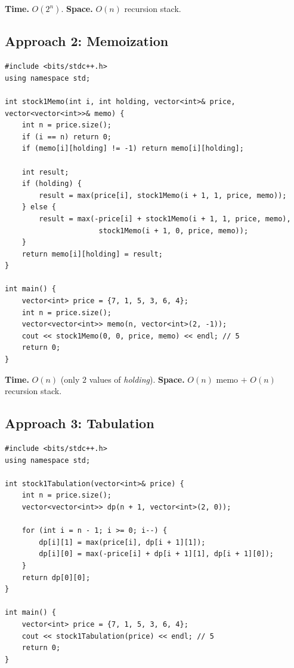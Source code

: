 \begin{complexitybox}
\textbf{Time.} $O(2^n)$.
\textbf{Space.} $O(n)$ recursion stack.
\end{complexitybox}

\subsection*{Approach 2: Memoization}

\begin{lstlisting}
#include <bits/stdc++.h>
using namespace std;

int stock1Memo(int i, int holding, vector<int>& price, vector<vector<int>>& memo) {
    int n = price.size();
    if (i == n) return 0;
    if (memo[i][holding] != -1) return memo[i][holding];

    int result;
    if (holding) {
        result = max(price[i], stock1Memo(i + 1, 1, price, memo));
    } else {
        result = max(-price[i] + stock1Memo(i + 1, 1, price, memo),
                      stock1Memo(i + 1, 0, price, memo));
    }
    return memo[i][holding] = result;
}

int main() {
    vector<int> price = {7, 1, 5, 3, 6, 4};
    int n = price.size();
    vector<vector<int>> memo(n, vector<int>(2, -1));
    cout << stock1Memo(0, 0, price, memo) << endl; // 5
    return 0;
}
\end{lstlisting}

\begin{complexitybox}
\textbf{Time.} $O(n)$ (only $2$ values of \textit{holding}).
\textbf{Space.} $O(n)$ memo $+$ $O(n)$ recursion stack.
\end{complexitybox}

\subsection*{Approach 3: Tabulation}

\begin{lstlisting}
#include <bits/stdc++.h>
using namespace std;

int stock1Tabulation(vector<int>& price) {
    int n = price.size();
    vector<vector<int>> dp(n + 1, vector<int>(2, 0));

    for (int i = n - 1; i >= 0; i--) {
        dp[i][1] = max(price[i], dp[i + 1][1]);
        dp[i][0] = max(-price[i] + dp[i + 1][1], dp[i + 1][0]);
    }
    return dp[0][0];
}

int main() {
    vector<int> price = {7, 1, 5, 3, 6, 4};
    cout << stock1Tabulation(price) << endl; // 5
    return 0;
}
\end{lstlisting}

